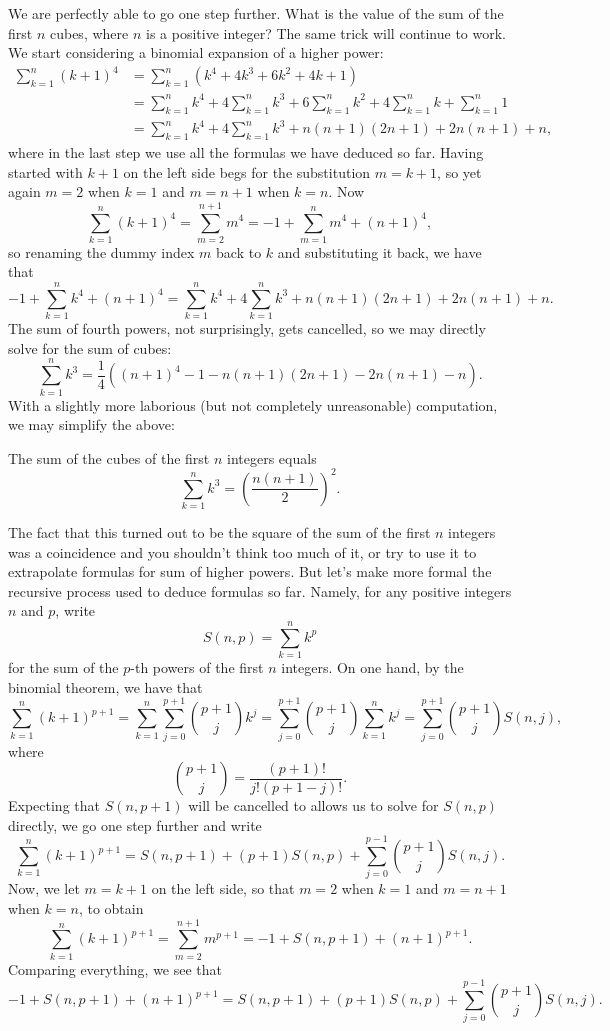 \documentclass[nooutcomes]{ximera}
\begin{document}
We are perfectly able to go one step further. What is the value of the sum of the first $n$ cubes, where $n$ is a positive integer? The same trick will continue to work. We start considering a binomial expansion of a higher power:
\begin{align*}
  \sum_{k=1}^n (k+1)^4 &= \sum_{k=1}^n (k^4+4k^3+6k^2+4k+1) \\ &= \sum_{k=1}^n k^4 + 4\sum_{k=1}^n k^3 + 6\sum_{k=1}^nk^2 + 4\sum_{k=1}^nk + \sum_{k=1}^n1 \\ &= \sum_{k=1}^nk^4 + 4\sum_{k=1}^nk^3 + n(n+1)(2n+1) + 2n(n+1) + n,
\end{align*}where in the last step we use all the formulas we have deduced so far. Having started with $k+1$ on the left side begs for the substitution $m=k+1$, so yet again $m=2$ when $k=1$ and $m=n+1$ when $k=n$. Now $$\sum_{k=1}^n (k+1)^4 = \sum_{m=2}^{n+1}m^4 = -1+\sum_{m=1}^n m^4 + (n+1)^4,  $$so renaming the dummy index $m$ back to $k$ and substituting it back, we have that $$-1+\sum_{k=1}^n k^4 + (n+1)^4=  \sum_{k=1}^nk^4 + 4\sum_{k=1}^nk^3 + n(n+1)(2n+1) + 2n(n+1) + n. $$The sum of fourth powers, not surprisingly, gets cancelled, so we may directly solve for the sum of cubes: $$ \sum_{k=1}^n k^3 = \frac{1}{4}\left((n+1)^4 - 1 - n(n+1)(2n+1)-2n(n+1)-n\right).$$ With a slightly more laborious (but not completely unreasonable) computation, we may simplify the above:

\begin{callout}
The sum of the cubes of the first $n$ integers equals $$\sum_{k=1}^n k^3 = \left(\frac{n(n+1)}{2}\right)^2.$$  
\end{callout}

The fact that this turned out to be the square of the sum of the first $n$ integers was a coincidence and you shouldn't think too much of it, or try to use it to extrapolate formulas for sum of higher powers. But let's make more formal the recursive process used to deduce formulas so far. Namely, for any positive integers $n$ and $p$, write \[  S(n,p) = \sum_{k=1}^n k^p  \]for the sum of the $p$-th powers of the first $n$ integers. On one hand, by the binomial theorem, we have that $$\sum_{k=1}^n (k+1)^{p+1} = \sum_{k=1}^n \sum_{j=0}^{p+1} {{p+1}\choose j} k^j = \sum_{j=0}^{p+1} {{p+1}\choose j}\sum_{k=1}^n k^j = \sum_{j=0}^{p+1} {{p+1}\choose j} S(n,j),$$ where $${{p+1}\choose j} = \frac{(p+1)!}{j!(p+1-j)!}.$$Expecting that $S(n,p+1)$ will be cancelled to allows us to solve for $S(n,p)$ directly, we go one step further and write $$\sum_{k=1}^n (k+1)^{p+1} = S(n,p+1) + (p+1)S(n,p) + \sum_{j=0}^{p-1} {{p+1}\choose j}S(n,j).$$Now, we let $m=k+1$ on the left side, so that $m=2$ when $k=1$ and $m=n+1$ when $k=n$, to obtain  $$ \sum_{k=1}^n(k+1)^{p+1} = \sum_{m=2}^{n+1} m^{p+1} = -1+S(n,p+1) + (n+1)^{p+1}.  $$Comparing everything, we see that $$-1+S(n,p+1)+(n+1)^{p+1} = S(n,p+1) + (p+1)S(n,p) + \sum_{j=0}^{p-1} {{p+1}\choose j}S(n,j).$$
\end{document}
